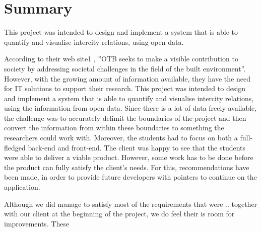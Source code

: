 \newpage

\chapter*{Summary}

This project was intended to design and implement a system that is able to quantify and visualise intercity relations, using open data. 

According to their web site1 , ”OTB seeks to make a visible contribution to society by addressing societal challenges in the field of the built environment”. However, with the growing amount of information available, they have the need for IT solutions to support their research. This project was intended to design and implement a system that is able to quantify and visualise intercity relations, using the information from open data. Since there is a lot of data freely available, the challenge was to accurately delimit the boundaries of the project and then convert the information from within these boundaries to something the researchers could work with. Moreover, the students had to focus on both a full-fledged back-end and front-end. The client was happy to see that the students were able to deliver a viable product. However, some work has to be done before the product can fully satisfy the client’s needs. For this, recommendations have been made, in order to provide future developers with pointers to continue on the application.






Although we did manage to satisfy most of the requirements that were .. together with our client at the beginning of the project, we do feel their is room for improvements. These 


